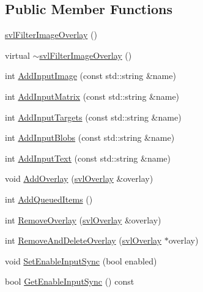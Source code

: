 \subsection*{Public Member Functions}
\begin{DoxyCompactItemize}
\item 
\hyperlink{classsvl_filter_image_overlay_ad8e6426a1d91c01b1fa244100decd246}{svl\-Filter\-Image\-Overlay} ()
\item 
virtual \hyperlink{classsvl_filter_image_overlay_a14deb084ab6aaee051606de8679afa3e}{$\sim$svl\-Filter\-Image\-Overlay} ()
\item 
int \hyperlink{classsvl_filter_image_overlay_a55209d9094f26404bec157445491875f}{Add\-Input\-Image} (const std\-::string \&name)
\item 
int \hyperlink{classsvl_filter_image_overlay_af6649342f865bcd70125a066e32bbc15}{Add\-Input\-Matrix} (const std\-::string \&name)
\item 
int \hyperlink{classsvl_filter_image_overlay_a887fa00813cbd2cc22766a51eceba371}{Add\-Input\-Targets} (const std\-::string \&name)
\item 
int \hyperlink{classsvl_filter_image_overlay_a5b1ca83eafa53f24dea3efcdcc89b083}{Add\-Input\-Blobs} (const std\-::string \&name)
\item 
int \hyperlink{classsvl_filter_image_overlay_ac2f752b66a68d996371fe0410422a571}{Add\-Input\-Text} (const std\-::string \&name)
\item 
void \hyperlink{classsvl_filter_image_overlay_a6f44d99a957f7afe7a31c611196273fc}{Add\-Overlay} (\hyperlink{classsvl_overlay}{svl\-Overlay} \&overlay)
\item 
int \hyperlink{classsvl_filter_image_overlay_a56745c5d2b39f246ed563309be041ccf}{Add\-Queued\-Items} ()
\item 
int \hyperlink{classsvl_filter_image_overlay_a21402287a1dfa675e1120f3584807cc1}{Remove\-Overlay} (\hyperlink{classsvl_overlay}{svl\-Overlay} \&overlay)
\item 
int \hyperlink{classsvl_filter_image_overlay_a29e129be2f262cbcaa946201d4614db2}{Remove\-And\-Delete\-Overlay} (\hyperlink{classsvl_overlay}{svl\-Overlay} $\ast$overlay)
\item 
void \hyperlink{classsvl_filter_image_overlay_a996c36ed3c06e33aa372a1dfc6b70199}{Set\-Enable\-Input\-Sync} (bool enabled)
\item 
bool \hyperlink{classsvl_filter_image_overlay_a36f871d87ae65b11b209a204bed0becd}{Get\-Enable\-Input\-Sync} () const 
\item 

\end{DoxyCompactItemize}
